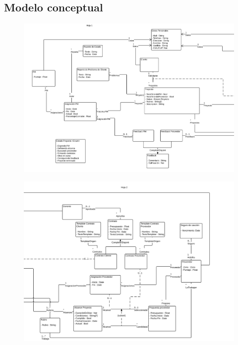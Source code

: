 \subsection{Modelo conceptual}

\begin{figure}[H]
\includegraphics[width=\linewidth]{conc1.png}
\end{figure}
\begin{figure}[H]
\includegraphics[width=\linewidth]{conc2.png}
\end{figure}

